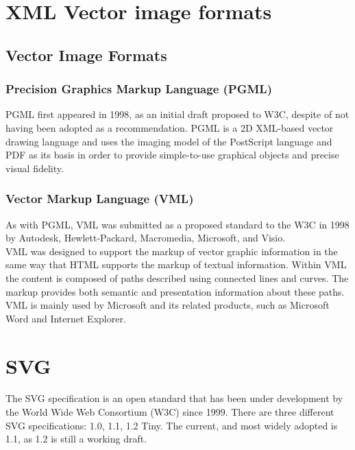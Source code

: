 \documentclass[twocolumn,twoside,10pt,a4paper]{article}
\begin{document}
\section{XML Vector image formats}
\subsection{Vector Image Formats}

\subsubsection{Precision Graphics Markup Language (PGML)}

PGML first appeared in 1998, as an initial draft proposed to W3C, despite of not having been adopted as a recommendation\cite{w3c:pgml}. PGML is a 2D XML-based vector drawing language and uses the imaging model of the PostScript language and PDF as its basis in order to provide simple-to-use graphical objects and precise visual fidelity.

\subsubsection{Vector Markup Language (VML)}

As with PGML, VML was submitted as a proposed standard to the W3C in 1998 by Autodesk, Hewlett-Packard, Macromedia, Microsoft, and Visio.\\

VML was designed to support the markup of vector graphic information in the same way that HTML supports the markup of textual information. Within VML the content is composed of paths described using connected lines and curves. The markup provides both semantic and presentation information about these paths.\\

VML is mainly used by Microsoft and its related products, such as Microsoft Word and Internet Explorer.

\section{SVG}

The SVG specification is an open standard that has been under development by the World Wide Web Consortium (W3C) since 1999. There are three different SVG specifications: 1.0, 1.1, 1.2 Tiny. The current, and most widely adopted is 1.1, as 1.2 is still a working draft.
\end{document}
